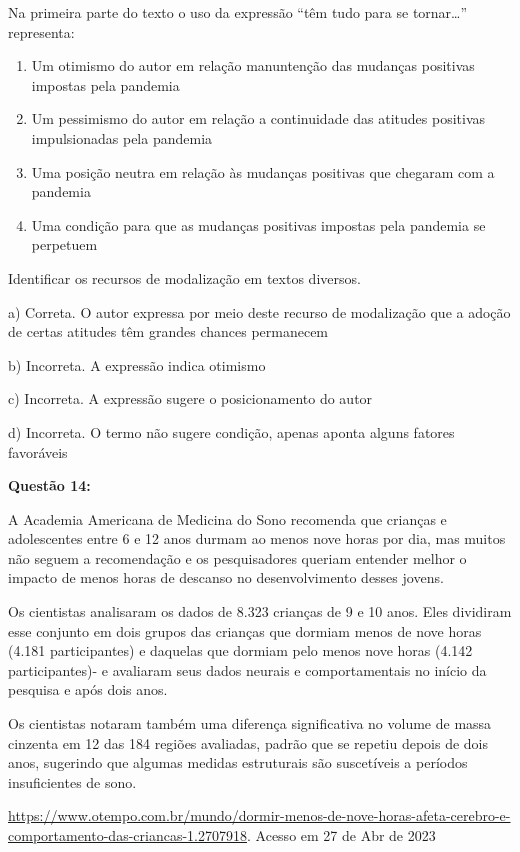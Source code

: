 Na primeira parte do texto o uso da expressão ``têm tudo para se
tornar\ldots'' representa:

\begin{enumerate}
\def\labelenumi{\alph{enumi})}
\item
  Um otimismo do autor em relação manuntenção das mudanças positivas
  impostas pela pandemia
\item
  Um pessimismo do autor em relação a continuidade das atitudes
  positivas impulsionadas pela pandemia
\item
  Uma posição neutra em relação às mudanças positivas que chegaram com a
  pandemia
\item
  Uma condição para que as mudanças positivas impostas pela pandemia se
  perpetuem
\end{enumerate}

Identificar os recursos de modalização em textos diversos.

a) Correta. O autor expressa por meio deste recurso de modalização que a
adoção de certas atitudes têm grandes chances permanecem

b) Incorreta. A expressão indica otimismo

c) Incorreta. A expressão sugere o posicionamento do autor

d) Incorreta. O termo não sugere condição, apenas aponta alguns fatores
favoráveis

\textbf{Questão 14:}

A Academia Americana de Medicina do Sono recomenda que crianças e
adolescentes entre 6 e 12 anos durmam ao menos nove horas por dia, mas
muitos não seguem a recomendação e os pesquisadores queriam entender
melhor o impacto de menos horas de descanso no desenvolvimento desses
jovens.

Os cientistas analisaram os dados de 8.323 crianças de 9 e 10 anos. Eles
dividiram esse conjunto em dois grupos das crianças que dormiam menos de
nove horas (4.181 participantes) e daquelas que dormiam pelo menos nove
horas (4.142 participantes)- e avaliaram seus dados neurais e
comportamentais no início da pesquisa e após dois anos.

Os cientistas notaram também uma diferença significativa no volume de
massa cinzenta em 12 das 184 regiões avaliadas, padrão que se repetiu
depois de dois anos, sugerindo que algumas medidas estruturais são
suscetíveis a períodos insuficientes de sono.

\href{https://www.otempo.com.br/mundo/dormir-menos-de-nove-horas-afeta-cerebro-e-comportamento-das-criancas-1.2707918}{{https://www.otempo.com.br/mundo/dormir-menos-de-nove-horas-afeta-cerebro-e-comportamento-das-criancas-1.2707918}}.
Acesso em 27 de Abr de 2023

